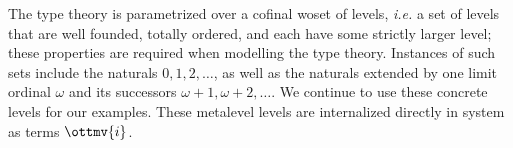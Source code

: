 \documentclass[a4paper,UKenglish,cleveref,autoref,thm-restate]{lipics-v2021}
\makeatletter
\newcommand{\ie}{\textit{i.e.}\@\xspace}
\makeatother
\begin{document}
The type theory is parametrized over a cofinal woset of levels,
\ie a set of levels that are well founded, totally ordered,
and each have some strictly larger level;
these properties are required when modelling the type theory.
Instances of such sets include the naturals $0, 1, 2, \dots$,
as well as the naturals extended by one limit ordinal $\omega$
and its successors $\omega + 1, \omega + 2, \dots$.
We continue to use these concrete levels for our examples.
These metalevel levels are internalized directly in system as terms $\ottmv{i}$.

\begin{figure}
\end{figure}
\end{document}
